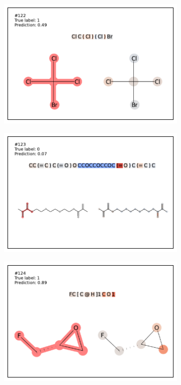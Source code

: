 \begin{figure}
\begin{subfigure}[b]{0.33\textwidth}
\end{subfigure} 
\begin{subfigure}[b]{0.33\textwidth} 
  \centering 
  \includegraphics[width=\textwidth]{figures/ames/ames122.pdf} 
\end{subfigure}\begin{subfigure}[b]{0.33\textwidth} 
  \centering 
  \includegraphics[width=\textwidth]{figures/ames/ames123.pdf} 
\end{subfigure}\begin{subfigure}[b]{0.33\textwidth} 
  \centering 
  \includegraphics[width=\textwidth]{figures/ames/ames124.pdf} 

\end{subfigure}
\end{figure}
